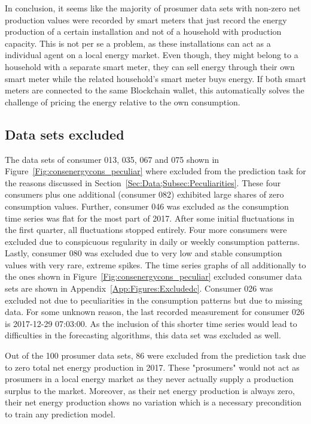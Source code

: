 In conclusion, it seems like the majority of prosumer data sets with non-zero net production values were recorded by smart meters that just record the energy production of a certain installation and not of a household with production capacity. This is not per se a problem, as these installations can act as a individual agent on a local energy market. Even though, they might belong to a household with a separate smart meter, they can sell energy through their own smart meter while the related household's smart meter buys energy. If both smart meters are connected to the same Blockchain wallet, this automatically solves the challenge of pricing the energy relative to the own consumption.


\subsection{Data sets excluded}\label{Sec:Data;Subsec:Exclusion}
The data sets of consumer 013, 035, 067 and 075 shown in Figure~\ref{Fig:consenergycons_peculiar} where excluded from the prediction task for the reasons discussed in Section~\ref{Sec:Data;Subsec:Peculiarities}. These four consumers plus one additional (consumer 082) exhibited large shares of zero consumption values. Further, consumer 046 was excluded as the consumption time series was flat for the most part of 2017. After some initial fluctuations in the first quarter, all fluctuations stopped entirely. Four more consumers were excluded due to conspicuous regularity in daily or weekly consumption patterns. Lastly, consumer 080 was excluded due to very low and stable consumption values with very rare, extreme spikes. The time series graphs of all additionally to the ones shown in Figure~\ref{Fig:consenergycons_peculiar} excluded consumer data sets are shown in Appendix~\ref{App:Figures:Excludedc}. Consumer 026 was excluded not due to peculiarities in the consumption patterns but due to missing data. For some unknown reason, the last recorded measurement for consumer 026 is 2017-12-29 07:03:00. As the inclusion of this shorter time series would lead to difficulties in the forecasting algorithms, this data set was excluded as well.

Out of the 100 prosumer data sets, 86 were excluded from the prediction task due to zero total net energy production in 2017. These "prosumers" would not act as prosumers in a local energy market as they never actually supply a production surplus to the market. Moreover, as their net energy production is always zero, their net energy production shows no variation which is a necessary precondition to train any prediction model.

